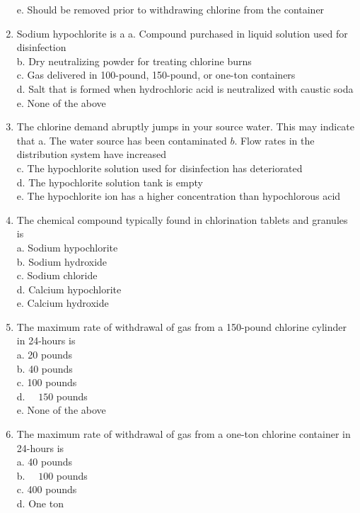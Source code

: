 \begin{enumerate}[1.]
e. Should be removed prior to withdrawing chlorine from the container\\
\item Sodium hypochlorite is a a. Compound purchased in liquid solution used for disinfection\\
b. Dry neutralizing powder for treating chlorine burns\\
c. Gas delivered in 100-pound, 150-pound, or one-ton containers\\
d. Salt that is formed when hydrochloric acid is neutralized with caustic soda\\
e. None of the above\\
\item The chlorine demand abruptly jumps in your source water. This may indicate that a. The water source has been contaminated $b$. Flow rates in the distribution system have increased\\
c. The hypochlorite solution used for disinfection has deteriorated\\
d. The hypochlorite solution tank is empty\\
e. The hypochlorite ion has a higher concentration than hypochlorous acid\\
\item The chemical compound typically found in chlorination tablets and granules is\\
a. Sodium hypochlorite\\
b. Sodium hydroxide\\
c. Sodium chloride\\
d. Calcium hypochlorite\\
e. Calcium hydroxide\\
\item The maximum rate of withdrawal of gas from a 150-pound chlorine cylinder in 24-hours is\\
a. 20 pounds\\
b. 40 pounds\\
c. 100 pounds\\
d. $\quad 150$ pounds\\
e. None of the above\\
\item The maximum rate of withdrawal of gas from a one-ton chlorine container in 24-hours is\\
a. 40 pounds\\
b. $\quad 100$ pounds\\
c. 400 pounds\\
d. One ton\\

\end{enumerate}
